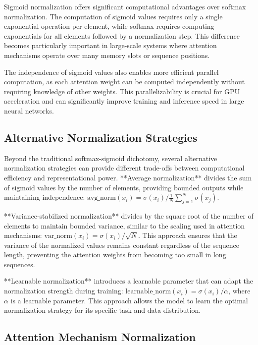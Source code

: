 \documentclass{article}
\begin{document}
Sigmoid normalization offers significant computational advantages over softmax normalization. The computation of sigmoid values requires only a single exponential operation per element, while softmax requires computing exponentials for all elements followed by a normalization step. This difference becomes particularly important in large-scale systems where attention mechanisms operate over many memory slots or sequence positions.

The independence of sigmoid values also enables more efficient parallel computation, as each attention weight can be computed independently without requiring knowledge of other weights. This parallelizability is crucial for GPU acceleration and can significantly improve training and inference speed in large neural networks.

\subsection{Alternative Normalization Strategies}

Beyond the traditional softmax-sigmoid dichotomy, several alternative normalization strategies can provide different trade-offs between computational efficiency and representational power. **Average normalization** divides the sum of sigmoid values by the number of elements, providing bounded outputs while maintaining independence: $\text{avg\_norm}(x_i) = \sigma(x_i) / \frac{1}{N}\sum_{j=1}^N \sigma(x_j)$.

**Variance-stabilized normalization** divides by the square root of the number of elements to maintain bounded variance, similar to the scaling used in attention mechanisms: $\text{var\_norm}(x_i) = \sigma(x_i) / \sqrt{N}$. This approach ensures that the variance of the normalized values remains constant regardless of the sequence length, preventing the attention weights from becoming too small in long sequences.

**Learnable normalization** introduces a learnable parameter that can adapt the normalization strength during training: $\text{learnable\_norm}(x_i) = \sigma(x_i) / \alpha$, where $\alpha$ is a learnable parameter. This approach allows the model to learn the optimal normalization strategy for its specific task and data distribution.

\subsection{Attention Mechanism Normalization}
\end{document}
